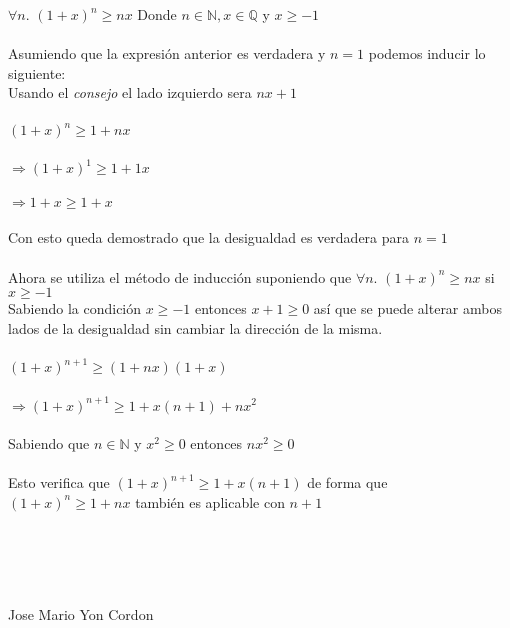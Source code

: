 \documentclass[]{article}
\begin{document}
\begin{center}
$\forall n.$ $(1+x)^n \geq nx$ Donde $n \in \mathbb{N}, x \in \mathbb{Q} $ y $ x \geq -1$\\~\\
Asumiendo que la expresión anterior es verdadera y $n = 1$ podemos inducir lo siguiente:\\
Usando el \emph{consejo} el lado izquierdo sera $nx +1$\\~\\
$(1+x)^n \geq 1+nx$\\~\\
$\Longrightarrow (1+x)^1 \geq 1+1x$\\~\\
$\Longrightarrow 1+x \geq 1+x$\\~\\
Con esto queda demostrado que la desigualdad es verdadera para $n=1$\\~\\
Ahora se utiliza el método de inducción suponiendo que $\forall n.$ $(1+x)^n \geq nx$ si $x \geq -1$\\
Sabiendo la condición $x \geq -1$ entonces $x+1 \geq 0$ así que se puede alterar ambos lados de la desigualdad sin cambiar la dirección de la misma.\\~\\
$(1+x)^{n+1} \geq (1+nx)(1+x)$\\~\\
$\Longrightarrow (1+x)^{n+1} \geq 1+x(n+1)+nx^2$\\~\\
Sabiendo que $n \in \mathbb{N}$ y $x^2 \geq 0$ entonces $nx^2 \geq 0$\\~\\
Esto verifica que $(1+x)^{n+1} \geq 1+x(n+1)$ de forma que $(1+x)^n \geq 1+nx$ también es aplicable con $n+1$\\~\\~\\~\\~\\
\end{center}
\small
Jose Mario Yon Cordon
\end{document}
